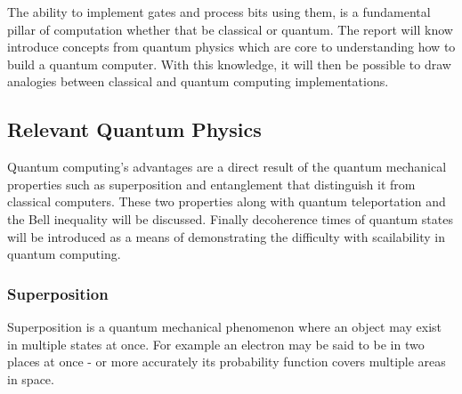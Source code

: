  The ability to implement gates and process bits using them, is a fundamental pillar of computation whether that be classical or quantum. The report will know introduce concepts from quantum physics which are core to understanding how to build a quantum computer. With this knowledge, it will then be possible to draw analogies between classical and quantum computing implementations.

\subsection{Relevant Quantum Physics}

Quantum computing's advantages are a direct result of the quantum mechanical properties such as superposition and entanglement that distinguish it from classical computers. 
These two properties along with quantum teleportation and the Bell inequality will be discussed.
Finally decoherence times of quantum states will be introduced as a means of demonstrating the difficulty with scailability in quantum computing. 


\subsubsection{Superposition}
Superposition is a quantum mechanical phenomenon where an object may exist in multiple states at once. 
For example an electron may be said to be in two places at once - or more accurately its probability function covers multiple areas in space. \cite{noauthor_whatCal_nodate}

